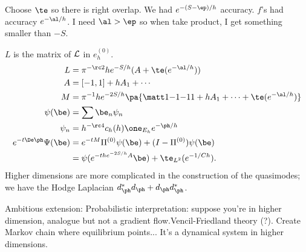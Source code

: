 Choose $\te$ so there is right overlap. We had $e^{-(S-\ep)/h}$ accuracy. $f$'s had accuracy $e^{-\al/h}$. I need $\al>\ep$ so when take product, I get something smaller than $-S$. 

$L$ is the matrix of $\cal L$ in $e_h^{(0)}$.
\begin{align}
L &= \pi^{-\rc 2} he^{-S/h} (A + \te(e^{-\al/h}))\\
A&= [-1,1] + hA_1+\cdots\\
M&= \pi^{-1} h e^{-2S/h} \pa{
\matt1{-1}{-1}1+hA_1 + \cdots + \te(e^{-\al/h})
}\\
\psi(\be) &= \sum \be_n\psi_n\\
\psi_n &= h^{-\rc 4} c_h(h) \one_{E_h} e^{-\ph/h}\\
e^{-t\De\ph}\Psi(\be) &= e^{-tM}\Pi^{(0)} \psi(\be) + (I-\Pi^{(0)}) \psi(\be)\\
&= \psi(e^{-t h e^{-2S/h} A}\be) + \te_{L^2} (e^{-1/Ch}).
\end{align}
Higher dimensions are more complicated in the construction of the quasimodes; we have the Hodge Laplacian $d_\ph^*d_\ph + d_\ph d_\ph^*$. 

Ambitious extension: Probabilistic interpretation: suppose you're in higher dimension, analogue but not a gradient flow.Vencil-Friedland theory (?). Create Markov chain where equilibrium points... It's a dynamical system in higher dimensions. 

